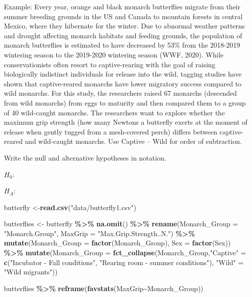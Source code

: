 \documentclass[
]{report}
\newenvironment{Shaded}{\begin{snugshade}}{\end{snugshade}}
\newcommand{\AttributeTok}[1]{\textcolor[rgb]{0.13,0.29,0.53}{#1}}
\newcommand{\FunctionTok}[1]{\textcolor[rgb]{0.13,0.29,0.53}{\textbf{#1}}}
\newcommand{\NormalTok}[1]{#1}
\newcommand{\OtherTok}[1]{\textcolor[rgb]{0.56,0.35,0.01}{#1}}
\newcommand{\SpecialCharTok}[1]{\textcolor[rgb]{0.81,0.36,0.00}{\textbf{#1}}}
\newcommand{\StringTok}[1]{\textcolor[rgb]{0.31,0.60,0.02}{#1}}
\begin{document}
Example: Every year, orange and black monarch butterflies migrate from their summer breeding grounds in the US and Canada to mountain forests in central Mexico, where they hibernate for the winter. Due to abnormal weather patterns and drought affecting monarch habitats and feeding grounds, the population of monarch butterflies is estimated to have decreased by 53\% from the 2018-2019 wintering season to the 2019-2020 wintering season (WWF, 2020). While conservationists often resort to captive-rearing with the goal of raising biologically indistinct individuals for release into the wild, tagging studies have shown that captive-reared monarchs have lower migratory success compared to wild monarchs. For this study, the researchers raised 67 monarchs (descended from wild monarchs) from eggs to maturity and then compared them to a group of 40 wild-caught monarchs. The researchers want to explore whether the maximum grip strength (how many Newtons a butterfly exerts at the moment of release when gently tugged from a mesh-covered perch) differs between captive-reared and wild-caught monarchs. Use Captive -- Wild for order of subtraction.

Write the null and alternative hypotheses in notation.

\(H_0:\)

\vspace{0.2in}

\(H_A:\)

\vspace{0.2in}

\begin{Shaded}
\begin{Highlighting}[]
\NormalTok{butterfly }\OtherTok{\textless{}{-}}\FunctionTok{read.csv}\NormalTok{(}\StringTok{"data/butterfly1.csv"}\NormalTok{)}

\NormalTok{butterflies }\OtherTok{\textless{}{-}}\NormalTok{ butterfly }\SpecialCharTok{\%\textgreater{}\%} \FunctionTok{na.omit}\NormalTok{() }\SpecialCharTok{\%\textgreater{}\%}
    \FunctionTok{rename}\NormalTok{(}\AttributeTok{Monarch\_Group =} \StringTok{"Monarch.Group"}\NormalTok{,}
           \AttributeTok{MaxGrip =} \StringTok{"Max.Grip.Strength..N."}\NormalTok{) }\SpecialCharTok{\%\textgreater{}\%}
    \FunctionTok{mutate}\NormalTok{(}\AttributeTok{Monarch\_Group =} \FunctionTok{factor}\NormalTok{(Monarch\_Group),}
           \AttributeTok{Sex =} \FunctionTok{factor}\NormalTok{(Sex)) }\SpecialCharTok{\%\textgreater{}\%}
    \FunctionTok{mutate}\NormalTok{(}\AttributeTok{Monarch\_Group =} \FunctionTok{fct\_collapse}\NormalTok{(Monarch\_Group,}\StringTok{"Captive"} \OtherTok{=} \FunctionTok{c}\NormalTok{(}\StringTok{"Incubator {-} Fall conditions"}\NormalTok{, }\StringTok{"Rearing room {-} summer conditions"}\NormalTok{), }\StringTok{"Wild"} \OtherTok{=} \StringTok{"Wild migrants"}\NormalTok{))}

\NormalTok{butterflies }\SpecialCharTok{\%\textgreater{}\%}
    \FunctionTok{reframe}\NormalTok{(}\FunctionTok{favstats}\NormalTok{(MaxGrip}\SpecialCharTok{\textasciitilde{}}\NormalTok{Monarch\_Group))}
\end{Highlighting}
\end{Shaded}
\end{document}
